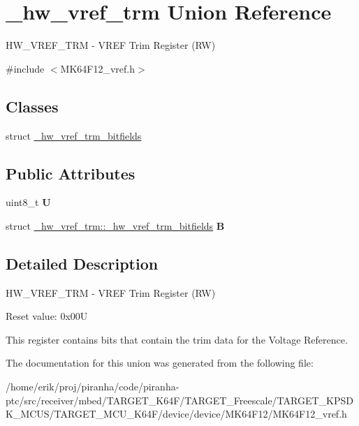 \hypertarget{union__hw__vref__trm}{}\section{\+\_\+hw\+\_\+vref\+\_\+trm Union Reference}
\label{union__hw__vref__trm}


H\+W\+\_\+\+V\+R\+E\+F\+\_\+\+T\+RM -\/ V\+R\+EF Trim Register (RW)  




{\ttfamily \#include $<$M\+K64\+F12\+\_\+vref.\+h$>$}

\subsection*{Classes}
\begin{DoxyCompactItemize}
\item 
struct \hyperlink{struct__hw__vref__trm_1_1__hw__vref__trm__bitfields}{\+\_\+hw\+\_\+vref\+\_\+trm\+\_\+bitfields}
\end{DoxyCompactItemize}
\subsection*{Public Attributes}
\begin{DoxyCompactItemize}
\item 
uint8\+\_\+t {\bfseries U}\hypertarget{union__hw__vref__trm_af096962e73aa0f609336b3517ef8d2cd}{}\label{union__hw__vref__trm_af096962e73aa0f609336b3517ef8d2cd}

\item 
struct \hyperlink{struct__hw__vref__trm_1_1__hw__vref__trm__bitfields}{\+\_\+hw\+\_\+vref\+\_\+trm\+::\+\_\+hw\+\_\+vref\+\_\+trm\+\_\+bitfields} {\bfseries B}\hypertarget{union__hw__vref__trm_a6a4e4127c37f08645be685e11b0d32c3}{}\label{union__hw__vref__trm_a6a4e4127c37f08645be685e11b0d32c3}

\end{DoxyCompactItemize}


\subsection{Detailed Description}
H\+W\+\_\+\+V\+R\+E\+F\+\_\+\+T\+RM -\/ V\+R\+EF Trim Register (RW) 

Reset value\+: 0x00U

This register contains bits that contain the trim data for the Voltage Reference. 

The documentation for this union was generated from the following file\+:\begin{DoxyCompactItemize}
\item 
/home/erik/proj/piranha/code/piranha-\/ptc/src/receiver/mbed/\+T\+A\+R\+G\+E\+T\+\_\+\+K64\+F/\+T\+A\+R\+G\+E\+T\+\_\+\+Freescale/\+T\+A\+R\+G\+E\+T\+\_\+\+K\+P\+S\+D\+K\+\_\+\+M\+C\+U\+S/\+T\+A\+R\+G\+E\+T\+\_\+\+M\+C\+U\+\_\+\+K64\+F/device/device/\+M\+K64\+F12/M\+K64\+F12\+\_\+vref.\+h\end{DoxyCompactItemize}
